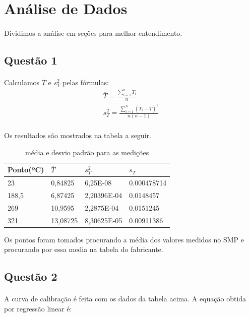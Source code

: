 \documentclass[a4paper,11pt]{article}
\begin{document}
\section{Análise de Dados}
\paragraph{} Dividimos a análise em seções para melhor entendimento.
\subsection{Questão 1}
\paragraph{}Calculamos $\overline{T}$ e $s_T^2$ pelas fórmulas:
	\begin{equation}
		\begin{array}{l}
		\overline{T} = \frac{\sum_{i = 1}^{n} T_i}{n} \\
		s_T^2 = \frac{\sum_{i = 1}^{n} (T_i - \overline{T})^2}{n(n-1)}
		\end{array}
	\end{equation}
	\paragraph{}Os resultados são mostrados na tabela a seguir.
\FloatBarrier
\begin{table}
		\centering
		\begin{tabular}{|l|l|l|l|} \hline
			Ponto(ºC)& $\overline{T}$ & $s_T^2$  & $s_T$ \\ \hline
			23		&       	0,84825	& 	6,25E-08		&0.000478714	\\ \hline
			188,5	& 		6,87425	&	2,20396E-04	&0.0148457	\\ \hline
			269   	&  		10,9595	& 	2,2875E-04	&	0.0151245\\ \hline
			321    	& 		13,08725&   8,30625E-05	&	0.00911386\\ \hline
		\end{tabular}
		\caption{média e desvio padrão para as medições}
		\label{tab:quest1}
\end{table}
\FloatBarrier
Os pontos foram tomados procurando a média dos valores medidos no SMP e 
procurando por essa media na tabela do fabricante.
\subsection{Questão 2}
\paragraph{} A curva de calibração é feita com os dados da tabela acima. A equação obtida por regressão linear
é:
\end{document}
